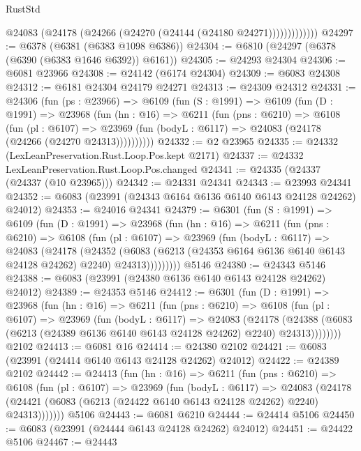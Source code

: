 \begin{lexlean}{RustStd}
\begin{coremodule}
                  @24083 (@24178 (@24266 (@24270 (@24144 (@24180 @24271)))))))))))))
@24297 := @6378 (@6381 (@6383 @1098 @6386))
@24304 := @6810 (@24297 (@6378 (@6390 (@6383 @1646 @6392)) @6161))
@24305 := @24293 @24304
@24306 := @6081 @23966
@24308 := @24142 (@6174 @24304)
@24309 := @6083 @24308
@24312 := @6181 @24304 @24179 @24271
@24313 := @24309 @24312
@24331 := @24306
    (fun (ps : @23966) =>
    @6109
      (fun (S : @1991) =>
      @6109
        (fun (D : @1991) =>
        @23968
          (fun (hn : @16) =>
          @6211
            (fun (pns : @6210) =>
            @6108
              (fun (pl : @6107) =>
              @23969 (fun (bodyL : @6117) => @24083 (@24178 (@24266 (@24270 @24313))))))))))
@24332 := @2 @23965
@24335 := @24332 (LexLeanPreservation.Rust.Loop.Pos.kept @2171)
@24337 := @24332 LexLeanPreservation.Rust.Loop.Pos.changed
@24341 := @24335 (@24337 (@24337 (@10 @23965)))
@24342 := @24331 @24341
@24343 := @23993 @24341
@24352 := @6083 (@23991 (@24343 @6164 @6136 @6140 @6143 @24128 @24262) @24012)
@24353 := @24016 @24341
@24379 := @6301
    (fun (S : @1991) =>
    @6109
      (fun (D : @1991) =>
      @23968
        (fun (hn : @16) =>
        @6211
          (fun (pns : @6210) =>
          @6108
            (fun (pl : @6107) =>
            @23969
              (fun (bodyL : @6117) =>
              @24083
                (@24178
                  (@24352
                    (@6083
                      (@6213 (@24353 @6164 @6136 @6140 @6143 @24128 @24262) @2240)
                      @24313)))))))))
    @5146
@24380 := @24343 @5146
@24388 := @6083 (@23991 (@24380 @6136 @6140 @6143 @24128 @24262) @24012)
@24389 := @24353 @5146
@24412 := @6301
    (fun (D : @1991) =>
    @23968
      (fun (hn : @16) =>
      @6211
        (fun (pns : @6210) =>
        @6108
          (fun (pl : @6107) =>
          @23969
            (fun (bodyL : @6117) =>
            @24083
              (@24178
                (@24388 (@6083 (@6213 (@24389 @6136 @6140 @6143 @24128 @24262) @2240) @24313))))))))
    @2102
@24413 := @6081 @16
@24414 := @24380 @2102
@24421 := @6083 (@23991 (@24414 @6140 @6143 @24128 @24262) @24012)
@24422 := @24389 @2102
@24442 := @24413
    (fun (hn : @16) =>
    @6211
      (fun (pns : @6210) =>
      @6108
        (fun (pl : @6107) =>
        @23969
          (fun (bodyL : @6117) =>
          @24083
            (@24178 (@24421 (@6083 (@6213 (@24422 @6140 @6143 @24128 @24262) @2240) @24313)))))))
    @5106
@24443 := @6081 @6210
@24444 := @24414 @5106
@24450 := @6083 (@23991 (@24444 @6143 @24128 @24262) @24012)
@24451 := @24422 @5106
@24467 := @24443

\end{coremodule}
\end{lexlean}
